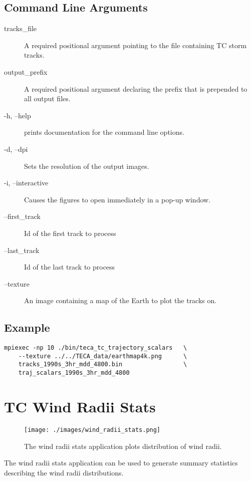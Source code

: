 \documentclass[a4paper,10pt,DIV=12]{scrreprt}
\begin{document}
\subsection{Command Line Arguments}
\begin{description}
\item[tracks\_file] A required positional argument pointing to the file containing TC storm tracks.
\item[output\_prefix] A required positional argument declaring the prefix that is prepended to all output files.
\item[-h, --help] prints documentation for the command line options.
\item[-d, --dpi] Sets the resolution of the output images.
\item[-i, --interactive] Causes the figures to open immediately in a pop-up window.
\item[--first\_track] Id of the first track to process
\item[--last\_track] Id of the last track to process
\item[--texture] An image containing a map of the Earth to plot the tracks on.
\end{description}

\subsection{Example}
\begin{verbatim}
mpiexec -np 10 ./bin/teca_tc_trajectory_scalars   \
    --texture ../../TECA_data/earthmap4k.png      \
    tracks_1990s_3hr_mdd_4800.bin                 \
    traj_scalars_1990s_3hr_mdd_4800
\end{verbatim}

\section{TC Wind Radii Stats}
\begin{wrapfigure}{r}{0.5\textwidth}
 \centering
 \texttt{[image: ./images/wind\_radii\_stats.png]}
 \caption{The wind radii stats application plots distribution of wind radii.}
 \label{fig:traj_scalar}
 \vspace{-110pt}
\end{wrapfigure}
The wind radii stats application can be used to generate summary statistics describing the wind radii distributions.
\end{document}
